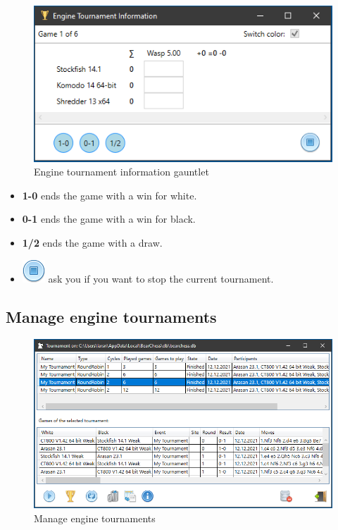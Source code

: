 \documentclass[11pt,a4paper]{article}
\begin{document}
\begin{figure}[H]
	\centering
	\includegraphics[scale=1.0]{EngineTournament6.png}
	\caption{Engine tournament information gauntlet}
	\label{fig:EngineTournameent6}
\end{figure}


\begin{itemize}
	\item \textbf{1-0} ends the game with a win for white.
	\item \textbf{0-1} ends the game with a win for black.
	\item \textbf{1/2} ends the game with a draw.
	\item \includegraphics[scale=0.5]{control_stop_blue.png} ask you if you want to stop the current tournament.
\end{itemize}

\subsection{Manage engine tournaments}

\begin{figure}[H]
	\centering
	\includegraphics[scale=0.6]{EngineTournament7.png}
	\caption{Manage engine tournaments}
	\label{fig:EngineTournament7}
\end{figure}
\end{document}

